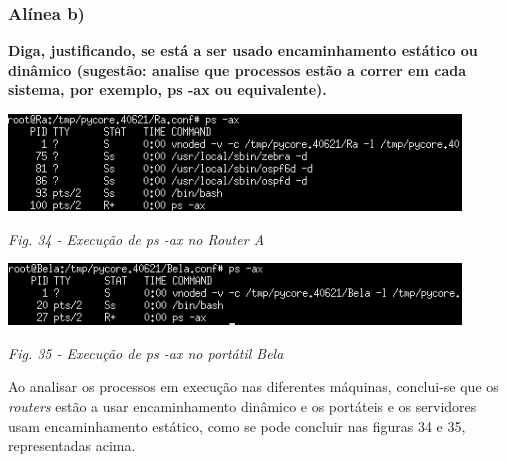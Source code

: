\documentclass{article}
\begin{document}
\subsubsection{Alínea b)}
\textbf{Diga, justificando, se está a ser usado encaminhamento estático ou dinâmico (sugestão: analise que processos
estão a correr em cada sistema, por exemplo, ps -ax ou equivalente).}\vspace{0.35cm}

\begin{center}
    \includegraphics[width = 12cm]{22a.png}\par\caption{\textit{Fig. 34 - Execução de ps -ax no Router A}}
\end{center}
\begin{center}
    \includegraphics[width = 12cm]{22b.png}\par\caption{\textit{Fig. 35 - Execução de ps -ax no portátil Bela}}
\end{center}
\hspace{0.5cm}Ao analisar os processos em execução nas diferentes
máquinas, conclui-se que os \textit{routers} estão a usar encaminhamento dinâmico e os
portáteis e os servidores usam encaminhamento estático, como se pode concluir nas figuras 34 e 35, representadas acima.\vspace{0.35cm}
\end{document}
